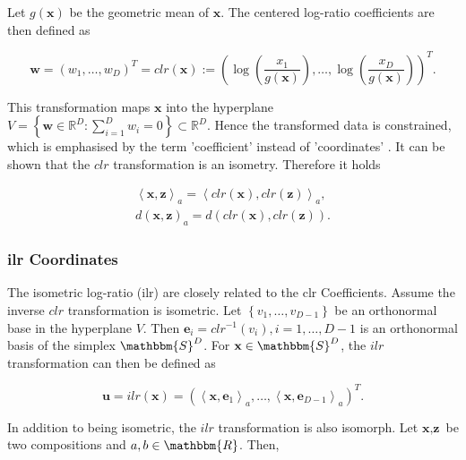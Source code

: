 Let $g(\textbf{x})$ be the geometric mean of $\textbf{x}$. The centered log-ratio coefficients are then defined as 

\begin{equation*}
\textbf{w} = (w_1,\ldots, w_D)^T = clr(\textbf{x}) := \left(\log\left(\frac{x_1}{g(\textbf{x})}\right),\ldots, \log\left(\frac{x_D}{g(\textbf{x})}\right)\right)^T .
\label{eq:clr Coefficients}
\end{equation*}

This transformation maps $\textbf{x}$ into the hyperplane $V = \left\{\textbf{w} \in \mathbb{R}^D: \sum_{i=1}^D w_i=0\right\} \subset \mathbb{R}^D$. Hence the transformed data is constrained, which is emphasised by the term 'coefficient' instead of 'coordinates' \cite{Filzmoser:2020}. It can be shown that the $clr$ transformation is an isometry\cite{Egozcue:2003}. Therefore it holds 

\begin{gather*}
\left\langle  \textbf{x},\textbf{z} \right\rangle_a = \left\langle  clr(\textbf{x}),clr(\textbf{z}) \right\rangle_a, \\
d(\textbf{x},\textbf{z})_a = d(clr(\textbf{x}),clr(\textbf{z})) .
\label{eq:clr Coefficients isometric}
\end{gather*}

\subsubsection{ilr Coordinates}
\label{sec:ilr Coordinates}

The isometric log-ratio (ilr) are closely related to the clr Coefficients. Assume the inverse $clr$ transformation is isometric. Let $\left\{v_1,\ldots,v_{D-1}\right\}$ be an orthonormal base in the hyperplane $V$. Then $\textbf{e}_i = clr^{-1}(v_i), i=1,\ldots,D-1$ is an orthonormal basis of the simplex $\mathbbm{S}^D$. For $\textbf{x} \in \mathbbm{S}^D$, the $ilr$ transformation can then be defined as  

\begin{equation*}
\textbf{u} = ilr(\textbf{x}) = \left(\left\langle \textbf{x},\textbf{e}_1\right\rangle_a,\ldots,\left\langle \textbf{x},\textbf{e}_{D-1}\right\rangle_a\right)^T .
\label{eq:ilr Coordinates}
\end{equation*}

In addition to being isometric, the $ilr$ transformation is also isomorph. Let $\textbf{x}, \textbf{z}$ be two compositions and $a, b  \in \mathbbm{R}$. Then,


